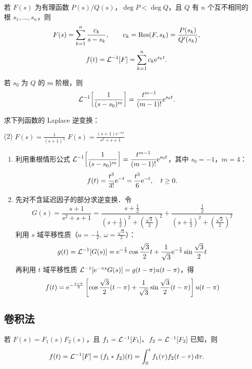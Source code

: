 \documentclass[12pt, a4paper, oneside, UTF8]{ctexbook}
\begin{document}
\begin{theorem}[部分分式展开]
若 $F(s)$ 为有理函数 $P(s)/Q(s)$，$\deg P < \deg Q$，且 $Q$ 有 $n$ 个互不相同的根 $s_1,\dots,s_n$，则
\[
F(s) = \sum_{k=1}^{n}\frac{c_k}{s-s_k},\qquad c_k = \Res(F,s_k) = \frac{P(s_k)}{Q'(s_k)},
\]
\[
f(t) = \mathcal{L}^{-1}[F] = \sum_{k=1}^{n} c_k \mathrm{e}^{s_k t}.
\]
\end{theorem}

\begin{theorem}[重根情形]
若 $s_0$ 为 $Q$ 的 $m$ 阶根，则
\[
\mathcal{L}^{-1}\!\left[\frac{1}{(s-s_0)^m}\right] = \frac{t^{m-1}}{(m-1)!}\mathrm{e}^{s_0 t}.
\]
\end{theorem}

\begin{example}
    求下列函数的 Laplace 逆变换：
    \begin{tasks}[label=(\arabic*)](2)
        \task $\displaystyle F(s) = \frac{1}{(s+1)^4}$
        \task $\displaystyle F(s) = \frac{(s+1)e^{-\pi s}}{s^2+s+1}$
    \end{tasks}
\end{example}
\begin{solution}
    \begin{enumerate}[label=(\arabic*)]
        \item 利用重根情形公式 $\displaystyle\mathcal{L}^{-1}\!\left[\frac{1}{(s-s_0)^m}\right]=\frac{t^{m-1}}{(m-1)!}\mathrm{e}^{s_0 t}$，其中 $s_0=-1$，$m=4$：
        \[
        f(t) = \frac{t^{3}}{3!}\mathrm{e}^{-t} = \frac{t^3}{6}\mathrm{e}^{-t},\quad t\ge 0.
        \]

        \item 先对不含延迟因子的部分求逆变换．令
        \[
        G(s)=\frac{s+1}{s^2+s+1}=\frac{s+\frac12}{\left(s+\frac12\right)^2+\left(\frac{\sqrt3}{2}\right)^2}
        +\frac{\frac12}{\left(s+\frac12\right)^2+\left(\frac{\sqrt3}{2}\right)^2}
        \]
        利用 $s$ 域平移性质（$a=-\frac12,\ \omega=\frac{\sqrt3}{2}$）：
        \[
        g(t)=\mathcal{L}^{-1}[G(s)]
        =\mathrm{e}^{-\frac{t}{2}}\cos\frac{\sqrt3}{2}t+\frac{1}{\sqrt3}\mathrm{e}^{-\frac{t}{2}}\sin\frac{\sqrt3}{2}t
        \]
        再利用 $t$ 域平移性质 $\mathcal{L}^{-1}[\mathrm{e}^{-\pi s}G(s)]=g(t-\pi)u(t-\pi)$，得
        \[
        f(t)=\mathrm{e}^{-\frac{t-\pi}{2}}\left[\cos\frac{\sqrt3}{2}(t-\pi)+\frac{1}{\sqrt3}\sin\frac{\sqrt3}{2}(t-\pi)\right]u(t-\pi)
        \]
    \end{enumerate}
\end{solution}

\subsection{卷积法}
\begin{theorem}[卷积法求逆变换]
若 $F(s)=F_1(s)F_2(s)$，且 $f_1=\mathcal{L}^{-1}[F_1]$、$f_2=\mathcal{L}^{-1}[F_2]$ 已知，则
\[
f(t) = \mathcal{L}^{-1}[F] = (f_1*f_2)(t) = \int_0^t f_1(\tau)f_2(t-\tau)\,\mathrm{d}\tau.
\]
\end{theorem}
\end{document}
